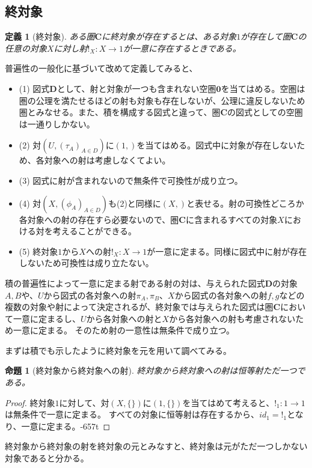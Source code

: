 \documentclass[dvipdfmx]{jsarticle}
\newcommand{\cat}[1]{\boldsymbol{#1}}
\newcommand{\arrow}{\rightarrow}
\newcommand{\mor}[3]{#1:#2\arrow #3}
\newtheorem{proof}{証明}[section]
\newtheorem{prop}{命題}[section]
\newtheorem{define}{定義}[section]
\numberwithin{proof}{subsection}
\numberwithin{prop}{subsection}
\numberwithin{define}{subsection}
\begin{document}
	\subsection{終対象}
	\begin{define}[終対象]
		ある圏$\cat{C}$に終対象が存在するとは、ある対象$1$が存在して圏$\cat{C}$の任意の対象$X$に対し射$\mor{!_X}{X}{1}$が一意に存在するときである。
	\end{define}
	普遍性の一般化に基づいて改めて定義してみると、
	\begin{itemize}
		\item (1)
		図式$\cat{D}$として、射と対象が一つも含まれない空圏$\cat{0}$を当てはめる。空圏は圏の公理を満たせるほどの射も対象も存在しないが、公理に違反しないため圏とみなせる。また、積を構成する図式と違って、圏$\cat{C}$の図式としての空圏は一通りしかない。
		\item (2)
		対$(U,(\tau_A)_{A\in D})$に$(1,{})$を当てはめる。図式中に対象が存在しないため、各対象への射は考慮しなくてよい。
		\item (3)
		図式に射が含まれないので無条件で可換性が成り立つ。
		\item (4)
		対$(X,(\phi_A)_{A\in D})$も(2)と同様に$(X,{})$と表せる。射の可換性どころか各対象への射の存在すら必要ないので、圏$\cat{C}$に含まれるすべての対象$X$における対を考えることができる。
		\item (5)
		終対象$1$から$X$への射$\mor{!_X}{X}{1}$が一意に定まる。同様に図式中に射が存在しないため可換性は成り立たない。
	\end{itemize}
	積の普遍性によって一意に定まる射である射の対は、与えられた図式$\cat{D}$の対象$A,B$や、$U$から図式の各対象への射$\pi_A,\pi_B$、$X$から図式の各対象への射$f,g$などの複数の対象や射によって決定されるが、終対象では与えられた図式は圏$\cat{C}$において一意に定まるし、$U$から各対象への射と$X$から各対象への射も考慮されないため一意に定まる。
	そのため射の一意性は無条件で成り立つ。

	まずは積でも示したように終対象を元を用いて調べてみる。
	\begin{prop}[終対象から終対象への射]
		終対象から終対象への射は恒等射ただ一つである。
	\end{prop}
	\begin{proof}
		終対象$1$に対して、対$(X,\{\})$に$(1,\{\})$を当てはめて考えると、$\mor{!_1}{1}{1}$は無条件で一意に定まる。
		すべての対象に恒等射は存在するから、$id_1=!_1$となり、一意に定まる。-657t
	\end{proof}
	終対象から終対象の射を終対象の元とみなすと、終対象は元がただ一つしかない対象であると分かる。
\end{document}
